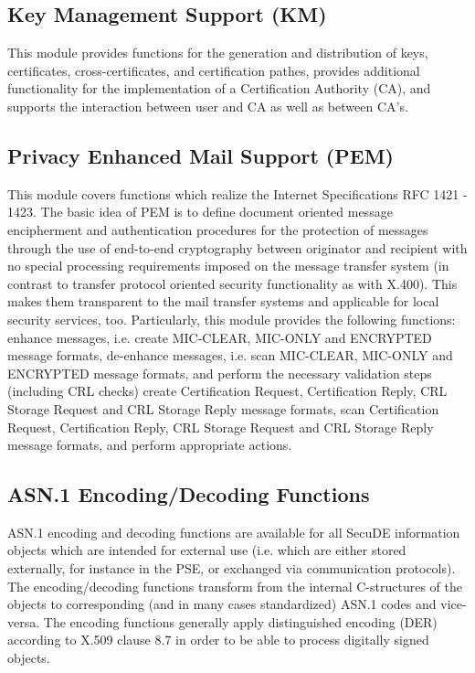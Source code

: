 \subsection{Key Management Support (KM)}
 
This module provides functions for the ge\-ne\-ra\-tion and distribution
of keys, certificates,
cross-certificates, and certification pathes, provides additional
functionality for the 
implementation of a Certification Authority (CA), and supports the
interaction between user and CA as well as between CA's.

\subsection{Privacy Enhanced Mail Support (PEM)}

This module covers functions 
which realize the Internet Specifications RFC 1421 - 1423. 
The basic idea of PEM is to define document oriented message 
encipherment and authentication procedures for the protection of 
messages through the use of 
end-to-end cryptography between originator and recipient with no special
processing
requirements imposed on the message transfer system (in contrast to
transfer 
protocol oriented security functionality as with X.400). This makes them
transparent to the mail 
transfer systems and applicable for local security services, too. 
Particularly, this module provides the following functions:
\bi
\m enhance messages, i.e. create MIC-CLEAR, MIC-ONLY and
   ENCRYPTED message formats,
\m de-enhance messages, i.e. scan MIC-CLEAR, MIC-ONLY and
   ENCRYPTED message formats, and perform the necessary
   validation steps (including CRL checks)
\m create Certification Request, Certification Reply, CRL Storage
   Request and CRL Storage Reply message formats,
\m scan Certification Request, Certification Reply, CRL Storage
   Request and CRL Storage Reply message formats, and perform
   appropriate actions.
\ei

\subsection{ASN.1 Encoding/Decoding Functions}

ASN.1 encoding and decoding functions are available 
for all SecuDE information objects which are intended for external
use (i.e. which are either stored externally, for instance in the
PSE, or exchanged via communication protocols). 
The encoding/decoding functions transform from the internal C-structures 
of the objects to corresponding (and in many cases standardized) ASN.1 codes
and vice-versa. The encoding functions generally apply distinguished encoding 
(DER) according to X.509 clause 8.7 in order to be able to process 
digitally signed objects.

